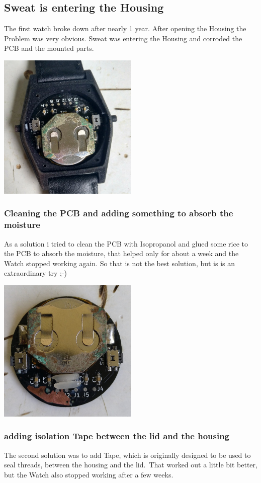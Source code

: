 \documentclass[12pt,a4paper,final]{article}
\begin{document}
\subsection{Sweat is entering the Housing}
The first watch broke down after nearly 1 year. After opening the Housing the Problem was very obvious. Sweat was entering the Housing and corroded the PCB and the mounted parts.
\begin{center}
  \includegraphics[width=0.5\textwidth]{../Pictures/ProbCorr1.jpg}
\end{center}
\subsubsection{Cleaning the PCB and adding something to absorb the moisture}
As a solution i tried to clean the PCB with Isopropanol and glued some rice to the PCB to absorb the moisture, that helped only for about a week and the Watch stopped working again. So that is not the best solution, but is is an extraordinary try ;-)
\begin{center}
  \includegraphics[width=0.5\textwidth]{../Pictures/ProbCorrSol1.jpg}
\end{center}
\subsubsection{adding isolation Tape between the lid and the housing}
The second solution was to add Tape, which is originally designed to be used to seal threads, between the housing and the lid.\
That worked out a little bit better, but the Watch also stopped working after a few weeks. 
\end{document}
